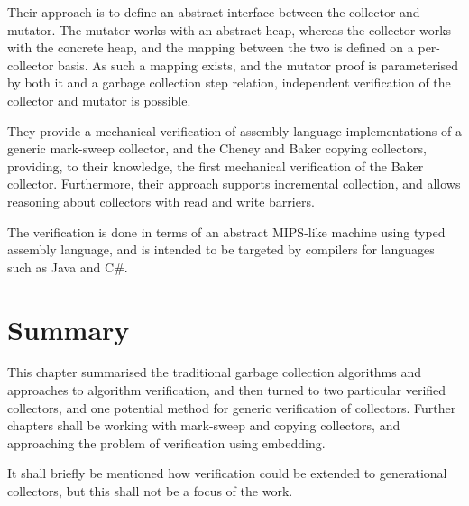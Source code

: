 Their approach is to define an abstract interface between the
collector and mutator. The mutator works with an abstract heap,
whereas the collector works with the concrete heap, and the mapping
between the two is defined on a per-collector basis. As such a mapping
exists, and the mutator proof is parameterised by both it and a
garbage collection step relation, independent verification of the
collector and mutator is possible.

They provide a mechanical verification of assembly language
implementations of a generic mark-sweep collector, and the Cheney and
Baker copying collectors, providing, to their knowledge, the first
mechanical verification of the Baker collector. Furthermore, their
approach supports incremental collection, and allows reasoning about
collectors with read and write barriers.

The verification is done in terms of an abstract MIPS-like machine
using typed assembly language, and is intended to be targeted by
compilers for languages such as Java and C\#.

\section{Summary}
\label{sec:lit-summary}

This chapter summarised the traditional garbage collection algorithms
and approaches to algorithm verification, and then turned to two
particular verified collectors, and one potential method for generic
verification of collectors. Further chapters shall be working with
mark-sweep and copying collectors, and approaching the problem of
verification using embedding.

It shall briefly be mentioned how verification could be extended to
generational collectors, but this shall not be a focus of the work.
